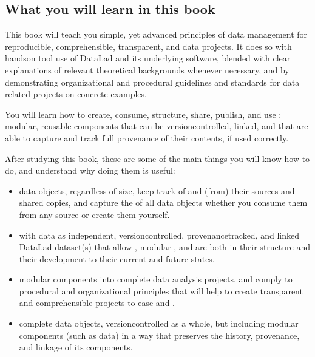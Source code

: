 \subsection{What you will learn in this book}
\label{\detokenize{intro/narrative:what-you-will-learn-in-this-book}}
\sphinxAtStartPar
This book will teach you simple, yet advanced principles of data
management for reproducible, comprehensible, transparent, and
 data
projects. It does so with hands\sphinxhyphen{}on tool use of DataLad and its
underlying software, blended with clear explanations of relevant
theoretical backgrounds whenever necessary, and by demonstrating
organizational and procedural guidelines and standards for data
related projects on concrete examples.

\sphinxAtStartPar
You will learn how to create, consume, structure, share, publish, and use
: modular, reusable components that can be version\sphinxhyphen{}controlled,
linked, and that are able to capture and track full provenance of their
contents, if used correctly.

\sphinxAtStartPar
After studying this book, these are some of the main
things you will know how to do, and understand why doing them is useful:
\begin{itemize}
\item {} 
\sphinxAtStartPar
{} data objects, regardless of size, keep track of
and  (from) their sources and shared copies, and capture the
 of all data objects whether you consume them from any source
or create them yourself.

\item {} 
\sphinxAtStartPar
{} with data as independent, version\sphinxhyphen{}controlled,
provenance\sphinxhyphen{}tracked, and linked DataLad dataset(s) that allow ,
modular , and are  both in their structure and their
development to their current and future states.

\item {} 
\sphinxAtStartPar
{} modular components into complete data analysis projects, and comply
to procedural and organizational principles that will help to create transparent
and comprehensible projects to ease  and .

\item {} 
\sphinxAtStartPar
{} complete data objects, version\sphinxhyphen{}controlled as a whole, but including
modular components (such as data) in a way that preserves the history,
provenance, and linkage of its components.

\end{itemize}

